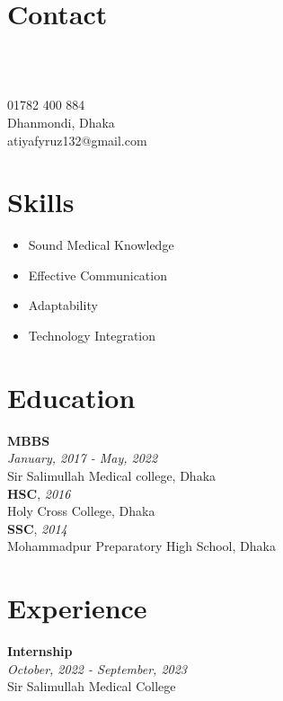 \documentclass[a4paper,12pt]{article}
\newcommand{\resumeentry}[2]{
    \textbf{#1} \\
    \textit{#2}
}
\begin{document}
\begin{minipage}[t][12cm]{0.3\textwidth}
\raggedright
\section*{Contact}
    \begin{minipage}[t]{0.1\textwidth}
        \faPhone\\
        \faMapMarker\\
        \faEnvelopeO
    \end{minipage}
    \begin{minipage}[t]{0.7\textwidth}
        01782 400 884\\
        Dhanmondi, Dhaka\\
        atiyafyruz132@gmail.com
    \end{minipage}
\section*{Skills}
\begin{itemize}[left=0em, itemsep=0pt, parsep=0pt]
  \item Sound Medical Knowledge
  \item Effective Communication
  \item Adaptability
  \item Technology Integration
\end{itemize}

\end{minipage}
\hspace{1.4cm}
\begin{minipage}[t][12cm]{0.6\textwidth}

\section*{Education}
  \resumeentry{MBBS}{January, 2017 - May, 2022}\\ Sir Salimullah Medical college, Dhaka \vspace{0.2cm} \\
  \textbf{HSC}, \textit{2016}\\ Holy Cross College, Dhaka \vspace{0.2cm} \\
  \textbf{SSC}, \textit{2014}\\ Mohammadpur Preparatory High School, Dhaka \\

\section*{Experience}
\resumeentry{Internship}{October, 2022 - September, 2023}\\ Sir Salimullah Medical College \vspace{0.2cm}\\
\end{minipage}
\end{document}
